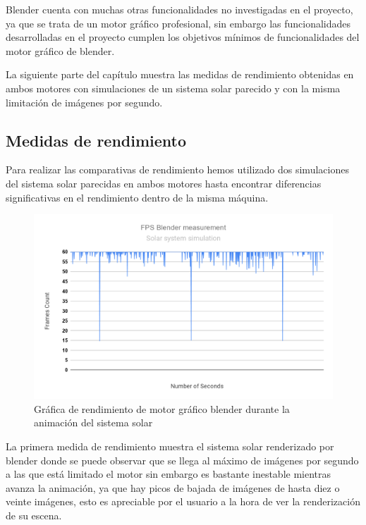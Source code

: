 \documentclass[a4paper, 17pt]{book}
\begin{document}
Blender cuenta con muchas otras funcionalidades no investigadas en el proyecto, ya que se trata de un motor gráfico profesional,
sin embargo las funcionalidades desarrolladas en el proyecto cumplen los objetivos mínimos de funcionalidades del motor gráfico de blender.

\vspace{1mm} %

La siguiente parte del capítulo muestra las medidas de rendimiento obtenidas en ambos motores con simulaciones de un sistema
solar parecido y con la misma limitación de imágenes por segundo.

\subsection{Medidas de rendimiento}

Para realizar las comparativas de rendimiento hemos utilizado dos simulaciones del sistema solar parecidas en ambos motores hasta
encontrar diferencias significativas en el rendimiento  dentro de la misma máquina. 

\begin{figure}[H]
    \centering
    \includegraphics[scale=0.25, keepaspectratio]{img/FPSBlender.png}
    \caption{Gráfica de rendimiento de motor gráfico blender durante la animación del sistema solar}
    \label{figura:materialesBlender}
\end{figure}

La primera medida de rendimiento muestra el sistema solar renderizado por blender donde se puede observar que se llega al máximo de
imágenes por segundo a las que está limitado el motor sin embargo es bastante inestable mientras avanza la animación, ya que hay
picos de bajada de imágenes de hasta diez o veinte imágenes, esto es apreciable por el usuario a la hora de ver la renderización
de su escena.
\end{document}
